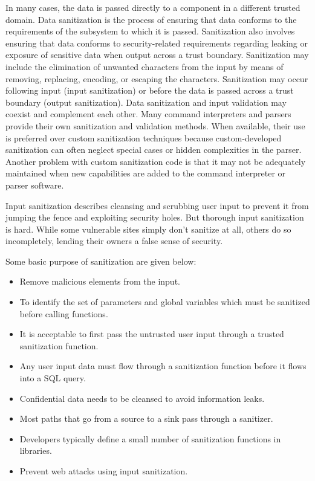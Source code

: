 In many cases, the data is passed directly to a component in a different trusted domain. Data sanitization is the process of ensuring that data conforms to the requirements of the subsystem to which it is passed. Sanitization also involves ensuring that data conforms to security-related requirements regarding leaking or exposure of sensitive data when output across a trust boundary. Sanitization may include the elimination of unwanted characters from the input by means of removing, replacing, encoding, or escaping the characters. Sanitization may occur following input (input sanitization) or before the data is passed across a trust boundary (output sanitization). Data sanitization and input validation may coexist and complement each other. Many command interpreters and parsers provide their own sanitization and validation methods. When available, their use is preferred over custom sanitization techniques because custom-developed sanitization can often neglect special cases or hidden complexities in the parser. Another problem with custom sanitization code is that it may not be adequately maintained when new capabilities are added to the command interpreter or parser software.

Input sanitization describes cleansing and scrubbing user input to prevent it from jumping the fence and exploiting security holes. But thorough input sanitization is hard. While some vulnerable sites simply don't sanitize at all, others do so incompletely, lending their owners a false sense of security.

Some basic purpose of sanitization are given below:
\begin{itemize}
	\item Remove malicious elements from the input.
	\item To identify the set of parameters and global variables which must be sanitized before calling functions.
	\item It is acceptable to first pass the untrusted user input through a trusted sanitization function.	
	\item Any user input data must flow through a sanitization function before it flows into a SQL query.
	\item Confidential data needs to be cleansed to avoid information leaks.
	\item Most paths that go from a source to a sink pass through a sanitizer.
	\item Developers typically define a small number of sanitization functions in libraries.
	\item Prevent web attacks using input sanitization.
\end{itemize}

